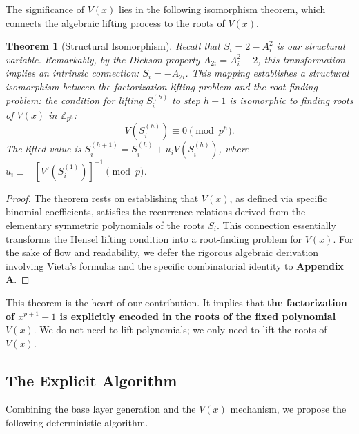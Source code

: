 \documentclass[12pt]{article}
\theoremstyle{plain}
\newtheorem{thm}{Theorem}[section]
\numberwithin{equation}{section}
\begin{document}
The significance of $V(x)$ lies in the following isomorphism theorem, which connects the algebraic lifting process to the roots of $V(x)$.

\begin{thm}[Structural Isomorphism]\label{thm:isomorphism}
Recall that $S_i = 2 - A_i^2$ is our structural variable. 
\emph{Remarkably, by the Dickson property $A_{2i} = A_i^2 - 2$, this transformation implies an intrinsic connection: $S_i = -A_{2i}$.}
This mapping establishes a structural isomorphism between the factorization lifting problem and the root-finding problem: the condition for lifting $S_i^{(h)}$ to step $h+1$ is isomorphic to finding roots of $V(x)$ in $\mathbb{Z}_{p^h}$:
\begin{equation}
    V(S_i^{(h)}) \equiv 0 \pmod{p^h}.
\end{equation}
The lifted value is $S_i^{(h+1)} = S_i^{(h)} + u_i V(S_i^{(h)})$, where $u_i \equiv -[V'(S_i^{(1)})]^{-1} \pmod p$.
\end{thm}

\begin{proof}
The theorem rests on establishing that $V(x)$, as defined via specific binomial coefficients, satisfies the recurrence relations derived from the elementary symmetric polynomials of the roots $S_i$. This connection essentially transforms the Hensel lifting condition into a root-finding problem for $V(x)$.
For the sake of flow and readability, we defer the rigorous algebraic derivation involving Vieta's formulas and the specific combinatorial identity to \textbf{Appendix A}.
\end{proof}

This theorem is the heart of our contribution. It implies that \textbf{the factorization of $x^{p+1}-1$ is explicitly encoded in the roots of the fixed polynomial $V(x)$}. We do not need to lift polynomials; we only need to lift the roots of $V(x)$.

\subsection{The Explicit Algorithm}

Combining the base layer generation and the $V(x)$ mechanism, we propose the following deterministic algorithm.
\end{document}
